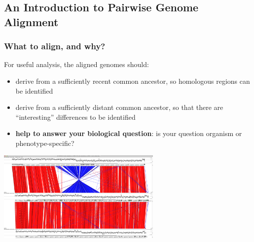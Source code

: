 

\subsection{An Introduction to Pairwise Genome Alignment}

\begin{frame}
  \frametitle{What to align, and why?}
  For useful analysis, the aligned genomes should:
  \begin{itemize}
    \item derive from a sufficiently recent common ancestor, so homologous regions can be identified
    \item derive from a sufficiently distant common ancestor, so that there are ``interesting'' differences to be identified
    \item \textbf{help to answer your biological question}: is your question organism or phenotype-specific? 
  \end{itemize}
  \begin{center}
    \includegraphics[width=0.6\textwidth]{images/act_comparison}
  \end{center}  
\end{frame}

